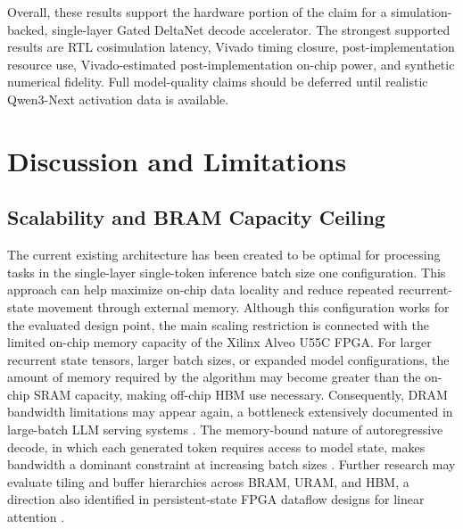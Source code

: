 \documentclass[conference]{IEEEtran}
\begin{document}
\begin{table}[t]
\centering
\caption{Recurrent-state storage and off-chip traffic accounting for MXFP4 $B=32$.}
\label{tab:state_traffic_results}
\scriptsize
{}
\end{table}

Overall, these results support the hardware portion of the claim for a simulation-backed, single-layer Gated DeltaNet decode accelerator. The strongest supported results are RTL cosimulation latency, Vivado timing closure, post-implementation resource use, Vivado-estimated post-implementation on-chip power, and synthetic numerical fidelity. Full model-quality claims should be deferred until realistic Qwen3-Next activation data is available.

\section{Discussion and Limitations}

\subsection{Scalability and BRAM Capacity Ceiling}
The current existing architecture has been created to be optimal for processing tasks in the single-layer single-token inference batch size one configuration. This approach can help maximize on-chip data locality and reduce repeated recurrent-state movement through external memory. Although this configuration works for the evaluated design point, the main scaling restriction is connected with the limited on-chip memory capacity of the Xilinx Alveo U55C FPGA. For larger recurrent state tensors, larger batch sizes, or expanded model configurations, the amount of memory required by the algorithm may become greater than the on-chip SRAM capacity, making off-chip HBM use necessary. Consequently, DRAM bandwidth limitations may appear again, a bottleneck extensively documented in large-batch LLM serving systems \cite{b1,b4,b7}. The memory-bound nature of autoregressive decode, in which each generated token requires access to model state, makes bandwidth a dominant constraint at increasing batch sizes \cite{b5}. Further research may evaluate tiling and buffer hierarchies across BRAM, URAM, and HBM, a direction also identified in persistent-state FPGA dataflow designs for linear attention \cite{b10}.
\end{document}
